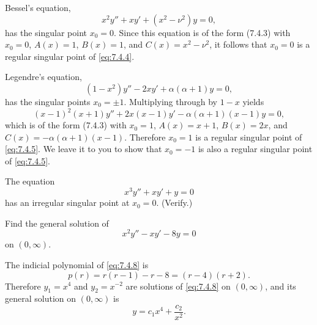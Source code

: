 \setcounter{example}{0}
\setcounter{equation}{3}
\begin{example}
  \label{example:7.4.1} \rm Bessel's equation,
  \begin{equation}
    \label{eq:7.4.4}x^{2}y''+xy'+(x^{2}-\nu^{2})y=0,
  \end{equation}
  has the singular point $x_{0}=0$. Since this equation is of the form \textup{(7.4.3)} with
  $x_{0}=0$, $A(x)=1$, $B(x)=1$, and $C(x)=x^{2}-\nu^{2}$, it follows that $x_{0}=0$ is a regular
  singular point of \eqref{eq:7.4.4}.
\end{example}

\setcounter{example}{1}
\setcounter{equation}{4}
\begin{example}
  \label{example:7.4.2} \rm Legendre's equation,
  \begin{equation}
    \label{eq:7.4.5}(1-x^{2})y''-2xy'+\alpha(\alpha+1)y=0,
  \end{equation}
  has the singular points $x_{0}=\pm1$. Multiplying through by $1-x$ yields
  \[
    (x-1)^{2}(x+1)y''+2x(x-1)y'-\alpha(\alpha+1)(x-1)y=0,
  \]
  which is of the form \textup{(7.4.3)} with $x_{0}=1$, $A(x)=x+1$, $B(x)=2x$, and
  $C(x)=-\alpha(\alpha+1)(x-1)$. Therefore $x_{0}=1$ is a regular singular point of
  \eqref{eq:7.4.5}. We leave it to you to show that $x_{0}=-1$ is also a regular singular point of
  \eqref{eq:7.4.5}.
\end{example}

\setcounter{example}{2}
\begin{example}
  \label{example:7.4.3} \rm The equation
  \[
    x^{3}y''+xy'+y=0
  \]
  has an irregular singular point at $x_{0}=0$. (Verify.)
\end{example}

\setcounter{example}{3}
\setcounter{equation}{7}
\begin{example}
  \label{example:7.4.4} \rm Find the general solution of
  \begin{equation}
    \label{eq:7.4.8}x^{2}y''-xy'-8y=0
  \end{equation}
  on $(0,\infty)$.
\end{example}
\begin{examplesolution}
\solution The indicial polynomial of \eqref{eq:7.4.8} is
\[
  p(r)=r(r-1)-r-8=(r-4)(r+2).
\]
Therefore $y_{1}=x^{4}$ and $y_{2}=x^{-2}$ are solutions of \eqref{eq:7.4.8} on $(0,\infty)$, and
its general solution on $(0,\infty)$ is
\[
  y=c_{1}x^{4}+\frac{c_{2}}{x^{2}}.
\]
\end{examplesolution}


